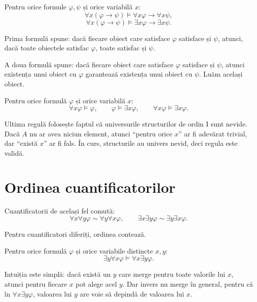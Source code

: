 \begin{prop}
	Pentru orice formule \( \varphi, \psi \) și orice variabilă \(x\):
	\[
		\forall x(\varphi \to \psi) \models \forall x\varphi \to \forall x\psi,
	\]
	\[
		\forall x(\varphi \to \psi) \models \exists x\varphi \to \exists x\psi.
	\]
\end{prop}

Prima formulă spune: dacă fiecare obiect care satisface \(\varphi\) satisface și \(\psi\), atunci, dacă toate obiectele satisfac \(\varphi\), toate satisfac și \(\psi\).

A doua formulă spune: dacă fiecare obiect care satisface \(\varphi\) satisface și \(\psi\), atunci existența unui obiect cu \(\varphi\) garantează existența unui obiect cu
\(\psi\). Luăm același obiect.

\begin{prop}
	Pentru orice formulă \( \varphi \) și orice variabilă \(x\):
	\[
		\forall x\varphi \models \varphi,
		\qquad
		\varphi \models \exists x\varphi,
		\qquad
		\forall x\varphi \models \exists x\varphi.
	\]
\end{prop}

\begin{note}
	Ultima regulă folosește faptul că universurile structurilor de ordin I sunt nevide. Dacă \(A\) nu ar avea niciun element, atunci ``pentru orice \(x\)''
	ar fi adevărat trivial, dar ``există \(x\)'' ar fi fals. În curs, structurile au univers nevid, deci regula este validă.
\end{note}

\section{Ordinea cuantificatorilor}

Cuantificatorii de același fel comută:
\[
	\forall x \forall y \varphi \sim \forall y \forall x \varphi,
	\qquad
	\exists x \exists y \varphi \sim \exists y \exists x \varphi.
\]

Pentru cuantificatori diferiți, ordinea contează.

\begin{prop}
	Pentru orice formulă \( \varphi \) și orice variabile distincte \(x,y\):
	\[
		\exists y \forall x \varphi \models \forall x \exists y \varphi.
	\]
\end{prop}

Intuiția este simplă: dacă există un \(y\) care merge pentru toate valorile lui \(x\), atunci pentru fiecare \(x\) pot alege acel \(y\). Dar invers nu merge în general,
pentru că în \( \forall x \exists y \varphi \), valoarea lui \(y\) are voie să depindă de valoarea lui \(x\).

